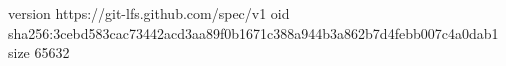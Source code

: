 version https://git-lfs.github.com/spec/v1
oid sha256:3cebd583cac73442acd3aa89f0b1671c388a944b3a862b7d4febb007c4a0dab1
size 65632
